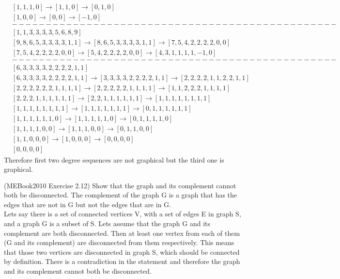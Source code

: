 \documentclass{article}
\begin{document}
\begin{problem}
\begin{align*}
&[1, 1, 1, 0]
\rightarrow [1, 1, 0]
\rightarrow [0, 1, 0]\\
&[1, 0, 0]
\rightarrow [0, 0]
\rightarrow [-1, 0]\\
&------------------------------------------------\\
& [1, 1, 3, 3, 3, 3, 5, 6, 8, 9]\\
&[9, 8, 6, 5, 3, 3, 3, 3, 1, 1]
\rightarrow [8, 6, 5, 3, 3, 3, 3, 1, 1]
\rightarrow [7, 5, 4, 2, 2, 2, 2, 0, 0]\\
&[7, 5, 4, 2, 2, 2, 2, 0, 0]
\rightarrow [5, 4, 2, 2, 2, 2, 0, 0]
\rightarrow [4, 3, 1, 1, 1, 1, -1, 0]\\
&------------------------------------------------\\
&[6, 3, 3, 3, 3, 2, 2, 2, 2, 1, 1]\\
&[6, 3, 3, 3, 3, 2, 2, 2, 2, 1, 1]
\rightarrow[3, 3, 3, 3, 2, 2, 2, 2, 1, 1]
\rightarrow[2, 2, 2, 2, 1, 1, 2, 2, 1, 1]\\
&[2, 2, 2, 2, 2, 2, 1, 1, 1, 1]
\rightarrow[2, 2, 2, 2, 2, 1, 1, 1, 1]
\rightarrow[1, 1, 2, 2, 2, 1, 1, 1, 1]\\
&[2, 2, 2, 1, 1, 1, 1, 1, 1]
\rightarrow[2, 2, 1, 1, 1, 1, 1, 1]
\rightarrow[1, 1, 1, 1, 1, 1, 1, 1]\\
&[1, 1, 1, 1, 1, 1, 1, 1]
\rightarrow[1, 1, 1, 1, 1, 1, 1]
\rightarrow[0, 1, 1, 1, 1, 1, 1]\\
&[1, 1, 1, 1, 1, 1, 0]
\rightarrow[1, 1, 1, 1, 1, 0]
\rightarrow[0, 1, 1, 1, 1, 0]\\
&[1, 1, 1, 1, 0, 0]
\rightarrow[1, 1, 1, 0, 0]
\rightarrow[0, 1, 1, 0, 0]\\
&[1, 1, 0, 0, 0]
\rightarrow[1, 0, 0, 0]
\rightarrow[0, 0, 0, 0]\\
&[0, 0, 0, 0]
\end{align*}
Therefore first two degree sequences are not graphical but the third one is graphical. 
\end{problem}

\begin{problem}
    (MEBook2010 Exercise 2.12) Show that the graph and its complement cannot both be disconnected. The complement of the graph G is a graph that has the edges that are not in G but not the edges that are in G.\\

    Lets say there is a set of connected vertices V, with a set of edges E in graph S, and a graph G is a subset of S. Lets assume that the graph G and its complement are both disconnected. Then at least one vertex from each of them (G and its complement) are disconnected from them respectively. This means that those two vertices are disconnected in graph S, which should be connected by definition. There is a contradiction in the statement and therefore the graph and its complement cannot both be disconnected. 
\end{problem}
\end{document}
